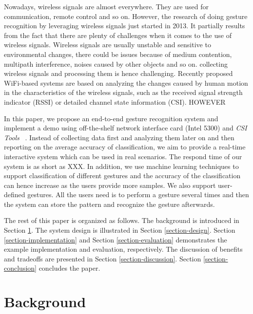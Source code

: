 \documentclass[conference]{IEEEtran}
\begin{document}
Nowadays, wireless signals are almost everywhere. They are used for communication, remote control and so on. However, the research of doing gesture recognition by leveraging wireless signals just started in 2013. It partially results from the fact that there are plenty of challenges when it comes to the use of wireless signals. 
Wireless signals are usually unstable and sensitive to environmental changes, there could be issues because of medium contention, multipath interference, noises caused by other objects and so on.
collecting wireless signals and processing them is hence challenging.
Recently proposed WiFi-based systems are based on analyzing the changes caused by human motion in the characteristics of the wireless signals, such as the received signal strength indicator (RSSI) or detailed channel state information (CSI). HOWEVER

In this paper, we propose an end-to-end gesture recognition system and implement a demo using off-the-shelf network interface card (Intel 5300) and \emph{CSI Tools} ~\cite{halperin2011tool}. 
Instead of collecting data first and analyzing them later on and then reporting on the average accuracy of classification, we aim to provide a real-time interactive system which can be used in real scenarios. 
The respond time of our system is as short as XXX. 
In addition, we use machine learning techniques to support classification of different gestures and the accuracy of the classification can hence increase as the users provide more samples.
We also support user-defined gestures. All the users need is to perform a gesture several times and then the system can store the pattern and recognize the gesture afterwards.

The rest of this paper is organized as follows.  The background is introduced in Section \ref{section-background}. The system design is illustrated in Section \ref{section-design}. Section \ref{section-implementation} and Section \ref{section-evaluation} demonstrates the example implementation and evaluation, respectively. The discussion of benefits and tradeoffs are presented in Section \ref{section-discussion}. Section \ref{section-conclusion} concludes the paper.

\section{Background} \label{section-background}
\end{document}
